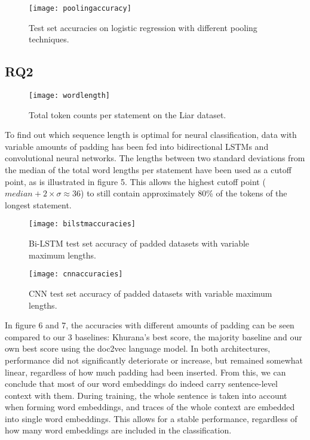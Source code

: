 \begin{figure}[t]
    \centering
    \texttt{[image: poolingaccuracy]}
    \caption{Test set accuracies on logistic regression with different pooling techniques.}
\end{figure}

\subsection{RQ2}

\begin{figure}[b]
    \centering
    \texttt{[image: wordlength]}
    \caption{Total token counts per statement on the Liar dataset.}
\end{figure}

To find out which sequence length is optimal for neural classification, data with variable amounts of padding has been fed into bidirectional LSTMs and convolutional neural networks.
The lengths between two standard deviations from the median of the total word lengths per statement have been used as a cutoff point, as is illustrated in figure 5. 
This allows the highest cutoff point (\(median + 2 \times \sigma \approx 36\)) to still contain approximately 80\% of the tokens of the longest statement.

\begin{figure}[t]
    \texttt{[image: bilstmaccuracies]}
    \caption{Bi-LSTM test set accuracy of padded datasets with variable maximum lengths.}
\end{figure}
    
\begin{figure}[b]
    \texttt{[image: cnnaccuracies]}
    \caption{CNN test set accuracy of padded datasets with variable maximum lengths.}
\end{figure}

In figure 6 and 7, the accuracies with different amounts of padding can be seen compared to our 3 baselines: Khurana's best score, the majority baseline and our own best score using the doc2vec language model.
In both architectures, performance did not significantly deteriorate or increase, but remained somewhat linear, regardless of how much padding had been inserted.
From this, we can conclude that most of our word embeddings do indeed carry sentence-level context with them.
During training, the whole sentence is taken into account when forming word embeddings, and traces of the whole context are embedded into single word embeddings.
This allows for a stable performance, regardless of how many word embeddings are included in the classification.

